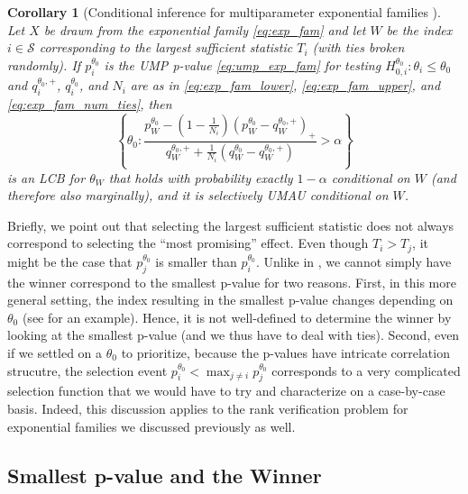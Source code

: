 \documentclass{article}
\newtheorem{corollary}{Corollary}
\begin{document}
\begin{appendix}
\begin{corollary}[Conditional inference for multiparameter exponential families ]
    \label{cor:cond_exp_fam}
    Let $X$ be drawn from the exponential family \eqref{eq:exp_fam} and let $W$ be the index $i \in \mathcal{S}$ corresponding to the largest sufficient statistic $T_i$ (with ties broken randomly). If $p^{\theta_0}_i$ is the UMP p-value \eqref{eq:ump_exp_fam} for testing $H^{\theta_0}_{0, i} : \theta_i \leq \theta_0 $ and $q^{\theta_0, +}_i$, $q^{\theta_0}_i$, and $N_i$ are as in \eqref{eq:exp_fam_lower}, \eqref{eq:exp_fam_upper}, and \eqref{eq:exp_fam_num_ties}, then 
    \begin{equation}
    \label{eq:cond_lcb_exp_fam}
    \left\{\theta_0 :  \frac{p^{\theta_0}_W - \left(1 - \frac{1}{N_i} \right)(p^{\theta_0}_W - q^{\theta_0, +}_W)_+ }{q^{\theta_0, +}_W + \frac{1}{N_i}(q^{\theta_0}_W - q^{\theta_0, +}_W) } > \alpha \right\} 
    \end{equation}
    is an LCB for $\theta_W$ that holds with probability exactly $1-\alpha$ conditional on $W$ (and therefore also marginally), and it is selectively UMAU conditional on $W$.
\end{corollary}

Briefly, we point out that selecting the largest sufficient statistic does not always correspond to selecting the ``most promising'' effect. Even though $T_i > T_j$, it might be the case that $p^{\theta_0}_{j}$ is smaller than $p^{\theta_0}_{i}$.  Unlike in , we cannot simply have the winner correspond to the smallest p-value for two reasons. First, in this more general setting, the index resulting in the smallest p-value changes depending on $\theta_0$ (see  for an example). Hence, it is not well-defined to determine the winner by looking at the smallest p-value (and we thus have to deal with ties). Second, even if we settled on a $\theta_0$ to prioritize, because the p-values have intricate correlation strucutre, the selection event $p^{\theta_0}_{i} < \max_{j \neq i} p^{\theta_0}_{j}$ corresponds to a very complicated selection function that we would have to try and characterize on a case-by-case basis. Indeed, this discussion applies to the rank verification problem for exponential families we discussed previously as well. 


\subsection{Smallest p-value and the Winner}
\label{sec:small_p_val_appdx}


\end{appendix}
\end{document}
